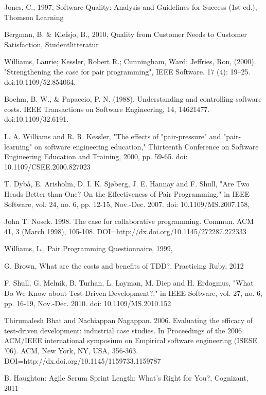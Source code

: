 \documentclass[letterpaper, 10 pt, conference]{ieeeconf}  %
\begin{document}
\begin{thebibliography}{99}

 Jones, C., 1997, Software Quality: Analysis and Guidelines for Success (1st ed.), Thomson Learning

 Bergman, B. \& Klefsjo, B., 2010, Quality from Customer Needs to Customer Satisfaction, Studentlitteratur

  Williams, Laurie; Kessler, Robert R.; Cunningham, Ward; Jeffries, Ron, (2000). "Strengthening the case for pair programming", IEEE Software. 17 (4): 19–25. doi:10.1109/52.854064.

 Boehm, B. W., \& Papaccio, P. N. (1988). Understanding and controlling software costs. IEEE Transactions on Software Engineering, 14, 14621477. doi:10.1109/32.6191.
 
 L. A. Williams and R. R. Kessler, "The effects of "pair-pressure" and "pair-learning" on software engineering education," Thirteenth Conference on Software Engineering Education and Training, 2000, pp. 59-65.
doi: 10.1109/CSEE.2000.827023

T. Dybå, E. Arisholm, D. I. K. Sjøberg, J. E. Hannay and F. Shull, "Are Two Heads Better than One? On the Effectiveness of Pair Programming," in IEEE Software, vol. 24, no. 6, pp. 12-15, Nov.-Dec. 2007.
doi: 10.1109/MS.2007.158,

John T. Nosek. 1998. The case for collaborative programming. Commun. ACM 41, 3 (March 1998), 105-108. DOI=http://dx.doi.org/10.1145/272287.272333 

Williams,
L.,
Pair
Programming
Questionnaire,
1999,

G. Brown, What are the costs and benefits of TDD?, Practicing Ruby, 2012 

F. Shull, G. Melnik, B. Turhan, L. Layman, M. Diep and H. Erdogmus, "What Do We Know about Test-Driven Development?," in IEEE Software, vol. 27, no. 6, pp. 16-19, Nov.-Dec. 2010.
doi: 10.1109/MS.2010.152

Thirumalesh Bhat and Nachiappan Nagappan. 2006. Evaluating the efficacy of test-driven development: industrial case studies. In Proceedings of the 2006 ACM/IEEE international symposium on Empirical software engineering (ISESE '06). ACM, New York, NY, USA, 356-363. DOI=http://dx.doi.org/10.1145/1159733.1159787


B. Haughton: Agile Scrum Sprint Length:
What’s Right for You?, Cognizant, 2011






\end{thebibliography}
\end{document}
